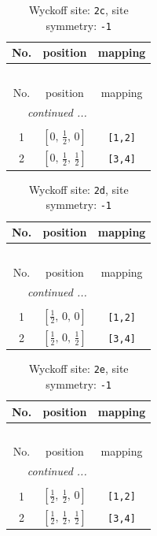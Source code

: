 \documentclass[fleqn,8pt]{jsarticle}
\begin{document}
\begin{longtable}{ccc}
\caption{Wyckoff site: {\tt 2c}, site symmetry: {\tt -1}}
 \\
 \hline \hline
No. & position & mapping \\ \hline \endfirsthead

\multicolumn{2}{l}{\tablename\ \thetable{}} \\
 \hline \hline
No. & position & mapping \\ \hline \endhead

 \hline \hline
\multicolumn{2}{r}{\footnotesize\it continued ...} \\ \endfoot

 \hline \hline
\multicolumn{2}{r}{} \\ \endlastfoot

1 & $\left[ 0,\, \frac{1}{2},\, 0 \right]$ & {\tt [1,2]} \\ \hline
2 & $\left[ 0,\, \frac{1}{2},\, \frac{1}{2} \right]$ & {\tt [3,4]} \\
\end{longtable}
\renewcommand{\arraystretch}{1.2}
\begin{longtable}{ccc}
\caption{Wyckoff site: {\tt 2d}, site symmetry: {\tt -1}}
 \\
 \hline \hline
No. & position & mapping \\ \hline \endfirsthead

\multicolumn{2}{l}{\tablename\ \thetable{}} \\
 \hline \hline
No. & position & mapping \\ \hline \endhead

 \hline \hline
\multicolumn{2}{r}{\footnotesize\it continued ...} \\ \endfoot

 \hline \hline
\multicolumn{2}{r}{} \\ \endlastfoot

1 & $\left[ \frac{1}{2},\, 0,\, 0 \right]$ & {\tt [1,2]} \\ \hline
2 & $\left[ \frac{1}{2},\, 0,\, \frac{1}{2} \right]$ & {\tt [3,4]} \\
\end{longtable}
\renewcommand{\arraystretch}{1.2}
\begin{longtable}{ccc}
\caption{Wyckoff site: {\tt 2e}, site symmetry: {\tt -1}}
 \\
 \hline \hline
No. & position & mapping \\ \hline \endfirsthead

\multicolumn{2}{l}{\tablename\ \thetable{}} \\
 \hline \hline
No. & position & mapping \\ \hline \endhead

 \hline \hline
\multicolumn{2}{r}{\footnotesize\it continued ...} \\ \endfoot

 \hline \hline
\multicolumn{2}{r}{} \\ \endlastfoot

1 & $\left[ \frac{1}{2},\, \frac{1}{2},\, 0 \right]$ & {\tt [1,2]} \\ \hline
2 & $\left[ \frac{1}{2},\, \frac{1}{2},\, \frac{1}{2} \right]$ & {\tt [3,4]} \\
\end{longtable}
\end{document}
